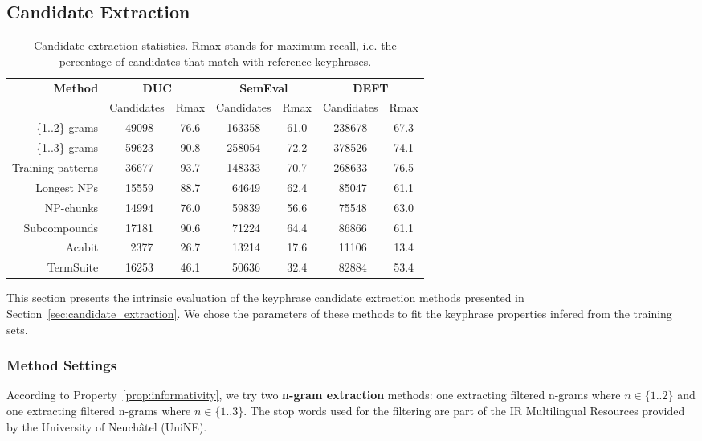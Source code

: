   \subsection{Candidate Extraction}
  \label{subsec:candidate_extraction}
    \begin{table*}
      \centering
      \begin{tabular}{rcccccc}
        \toprule
        \multirow{2}{*}[-2pt]{\textbf{Method}} & \multicolumn{2}{c}{\textbf{DUC}} & \multicolumn{2}{c}{\textbf{SemEval}} & \multicolumn{2}{c}{\textbf{DEFT}}\\
        \cmidrule(r){2-3}\cmidrule(lr){4-5}\cmidrule(l){6-7}
        & Candidates & Rmax & Candidates & Rmax & Candidates & Rmax\\
        \midrule
        \{1..2\}-grams & $~~$49098 & 76.6 & 163358 & 61.0 & 238678 & 67.3\\
        \{1..3\}-grams & $~~$59623 & 90.8 & 258054 & 72.2 & 378526 & 74.1\\
        Training patterns & $~~$36677 & 93.7 & 148333 & 70.7 & 268633 & 76.5\\
        Longest NPs & $~~$15559 & 88.7 & $~~$64649 & 62.4 & $~~$85047 & 61.1\\
        NP-chunks & $~~$14994 & 76.0 & $~~$59839 & 56.6 & $~~$75548 & 63.0\\
        Subcompounds & $~~$17181 & 90.6 & $~~$71224 & 64.4 & $~~$86866 & 61.1\\
        Acabit & $~~~~$2377 & 26.7 & $~~$13214 & 17.6 & $~~$11106 & 13.4\\
        TermSuite & $~~$16253 & 46.1 & $~~$50636 & 32.4 & $~~$82884 & 53.4\\
        \bottomrule
      \end{tabular}
      \caption{Candidate extraction statistics. Rmax stands for maximum recall,
               i.e. the percentage of candidates that match with reference
               keyphrases. \label{tab:candidate_extraction_statistics}}
    \end{table*}

    This section presents the intrinsic evaluation of the keyphrase candidate
    extraction methods presented in Section~\ref{sec:candidate_extraction}.
    We chose the parameters of these methods to fit the keyphrase properties
    infered from the training sets.

    \subsubsection{Method Settings}
    \label{subsubsec:method_settings}
      According to Property~\ref{prop:informativity}, we try two \textbf{n-gram
      extraction} methods: one extracting filtered n-grams where
      $n \in \{1..2\}$ and one extracting filtered n-grams where
      $n \in \{1..3\}$. The stop words used for the filtering are part of the IR
      Multilingual Resources provided by the University of Neuchâtel (UniNE).

